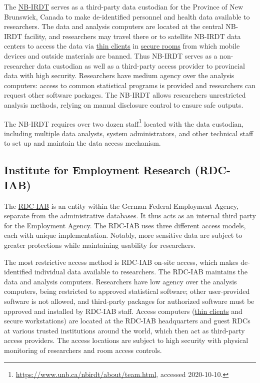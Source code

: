 The \protect\hyperlink{nbirdt}{NB-IRDT} serves as a third-party data custodian for the Province of New Brunswick, Canada to make de-identified personnel and health data available to researchers. The data and analysis computers are located at the central NB-IRDT facility, and researchers may travel there or to satellite NB-IRDT data centers to access the data via \protect\hyperlink{thin-clients}{thin clients} in \protect\hyperlink{secure-rooms}{secure rooms} from which mobile devices and outside materials are banned. Thus NB-IRDT serves as a non-researcher data custodian as well as a third-party access provider to provincial data with high security. Researchers have medium agency over the analysis computers: access to common statistical programs is provided and researchers can request other software packages. The NB-IRDT allows researchers unrestricted analysis methods, relying on manual disclosure control to ensure safe outputs.

The NB-IRDT requires over two dozen staff\footnote{\url{https://www.unb.ca/nbirdt/about/team.html}, accessed 2020-10-10.} located with the data custodian, including multiple data analysts, system administrators, and other technical staff to set up and maintain the data access mechanism.

\hypertarget{institute-for-employment-research-rdc-iab}{%
\subsection{Institute for Employment Research (RDC-IAB)}\label{institute-for-employment-research-rdc-iab}}

The \protect\hyperlink{iab}{RDC-IAB} is an entity within the German Federal Employment Agency, separate from the administrative databases. It thus acts as an internal third party for the Employment Agency. The RDC-IAB uses three different access models, each with unique implementation. Notably, more sensitive data are subject to greater protections while maintaining usability for researchers.

The most restrictive access method is RDC-IAB on-site access, which makes de-identified individual data available to researchers. The RDC-IAB maintains the data and analysis computers. Researchers have low agency over the analysis computers, being restricted to approved statistical software; other user-provided software is not allowed, and third-party packages for authorized software must be approved and installed by RDC-IAB staff. Access computers (\protect\hyperlink{thin-clients}{thin clients} and secure workstations) are located at the RDC-IAB headquarters and guest RDCs at various trusted institutions around the world, which then act as third-party access providers. The access locations are subject to high security with physical monitoring of researchers and room access controls.

